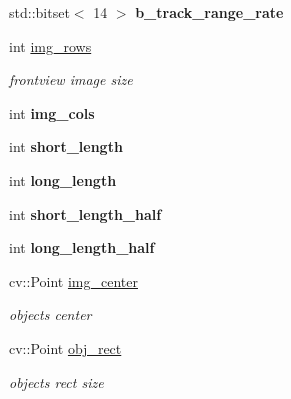 \begin{DoxyCompactItemize}
\item 
\hypertarget{class_radar_controller_add40eb49a30752a5d7d87760dedf28da}{}std\+::bitset$<$ 14 $>$ {\bfseries b\+\_\+track\+\_\+range\+\_\+rate}\label{class_radar_controller_add40eb49a30752a5d7d87760dedf28da}

\item 
\hypertarget{class_radar_controller_a41c267488c29d99fc311948d6437acee}{}int \hyperlink{class_radar_controller_a41c267488c29d99fc311948d6437acee}{img\+\_\+rows}\label{class_radar_controller_a41c267488c29d99fc311948d6437acee}

\begin{DoxyCompactList}\small\item\em frontview image size \end{DoxyCompactList}\item 
\hypertarget{class_radar_controller_afe9a6bda9ec385cb0bc2de0b2ee7a5c3}{}int {\bfseries img\+\_\+cols}\label{class_radar_controller_afe9a6bda9ec385cb0bc2de0b2ee7a5c3}

\item 
\hypertarget{class_radar_controller_ac6b4e52bad4f002135293fc78e0c576c}{}int {\bfseries short\+\_\+length}\label{class_radar_controller_ac6b4e52bad4f002135293fc78e0c576c}

\item 
\hypertarget{class_radar_controller_a6d3925b0699a4a41200022843da465a8}{}int {\bfseries long\+\_\+length}\label{class_radar_controller_a6d3925b0699a4a41200022843da465a8}

\item 
\hypertarget{class_radar_controller_a0ef37a3b9de90f3bf719d686dd5eb6db}{}int {\bfseries short\+\_\+length\+\_\+half}\label{class_radar_controller_a0ef37a3b9de90f3bf719d686dd5eb6db}

\item 
\hypertarget{class_radar_controller_a4e84d1deda486f38e7d74a11a9992d0a}{}int {\bfseries long\+\_\+length\+\_\+half}\label{class_radar_controller_a4e84d1deda486f38e7d74a11a9992d0a}

\item 
\hypertarget{class_radar_controller_aeb6f9f8674d251671cb735b05372098a}{}cv\+::\+Point \hyperlink{class_radar_controller_aeb6f9f8674d251671cb735b05372098a}{img\+\_\+center}\label{class_radar_controller_aeb6f9f8674d251671cb735b05372098a}

\begin{DoxyCompactList}\small\item\em object\textquotesingle{}s center \end{DoxyCompactList}\item 
\hypertarget{class_radar_controller_ad9d8ed1cb7b88a48c5bef62b88458df6}{}cv\+::\+Point \hyperlink{class_radar_controller_ad9d8ed1cb7b88a48c5bef62b88458df6}{obj\+\_\+rect}\label{class_radar_controller_ad9d8ed1cb7b88a48c5bef62b88458df6}

\begin{DoxyCompactList}\small\item\em object\textquotesingle{}s rect size \end{DoxyCompactList}\end{DoxyCompactItemize}

